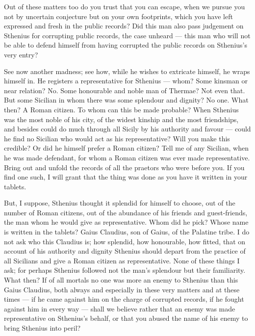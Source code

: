  Out of these matters too do you trust that you can escape, when we pursue you not by uncertain conjecture but on your own footprints, which you have left expressed and fresh in the public records? Did this man also pass judgement on Sthenius for corrupting public records, the case unheard --- this man who will not be able to defend himself from having corrupted the public records on Sthenius's very entry?

 See now another madness; see how, while he wishes to extricate himself, he wraps himself in. He registers a representative for Sthenius --- whom? Some kinsman or near relation? No. Some honourable and noble man of Thermae? Not even that. But some Sicilian in whom there was some splendour and dignity? No one. What then? A Roman citizen. To whom can this be made probable? When Sthenius was the most noble of his city, of the widest kinship and the most friendships, and besides could do much through all Sicily by his authority and favour --- could he find no Sicilian who would act as his representative? Will you make this credible? Or did he himself prefer a Roman citizen? Tell me of any Sicilian, when he was made defendant, for whom a Roman citizen was ever made representative. Bring out and unfold the records of all the praetors who were before you. If you find one such, I will grant that the thing was done as you have it written in your tablets.

 But, I suppose, Sthenius thought it splendid for himself to choose, out of the number of Roman citizens, out of the abundance of his friends and guest-friends, the man whom he would give as representative. Whom did he pick? Whose name is written in the tablets? Gaius Claudius, son of Gaius, of the Palatine tribe. I do not ask who this Claudius is; how splendid, how honourable, how fitted, that on account of his authority and dignity Sthenius should depart from the practice of all Sicilians and give a Roman citizen as representative. None of these things I ask; for perhaps Sthenius followed not the man's splendour but their familiarity. What then? If of all mortals no one was more an enemy to Sthenius than this Gaius Claudius, both always and especially in these very matters and at these times --- if he came against him on the charge of corrupted records, if he fought against him in every way --- shall we believe rather that an enemy was made representative on Sthenius's behalf, or that you abused the name of his enemy to bring Sthenius into peril?


